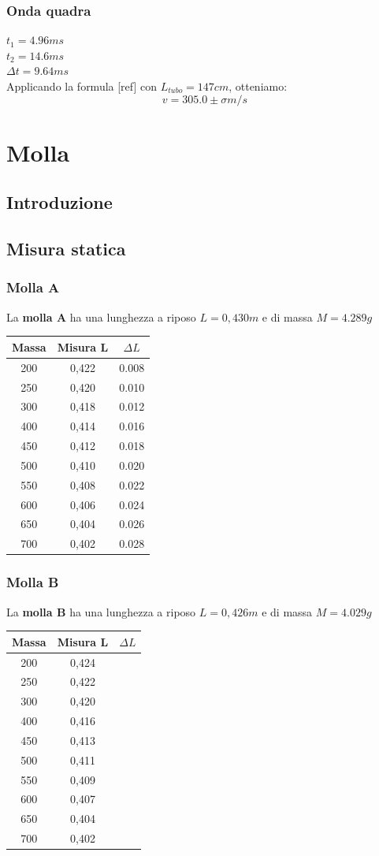 \documentclass[a4paper,10pt]{report}
\begin{document}
\subsection{Onda quadra}
$t_1 = 4.96 ms $\\
$t_2 = 14.6 ms $\\
$\Delta t = 9.64 ms $ \\
Applicando la formula [ref] con $L_{tubo} = 147 cm$, otteniamo:
$$ v = 305.0 \pm \sigma m/s $$ 



\chapter{Molla}
\section{Introduzione}
\section{Misura statica}
\subsection*{Molla A}
La \textbf{molla A} ha una lunghezza a riposo $L=0,430 m$ e di massa $M=4.289g$\\
\begin{tabular}{c|c|c}
Massa & Misura L & $\Delta L$ \\
\midrule
200 & 0,422 & 0.008\\
250 & 0,420 & 0.010\\
300 & 0,418 & 0.012\\
400 & 0,414 & 0.016\\
450 & 0,412 & 0.018\\
500 & 0,410 & 0.020\\
550 & 0,408 & 0.022\\
600 & 0,406 & 0.024\\
650 & 0,404 & 0.026\\
700 & 0,402 & 0.028\\
\end{tabular}
\subsection*{Molla B}
La \textbf{molla B} ha una lunghezza a riposo $L=0,426 m$ e di massa $M=4.029 g$\\
\begin{tabular}{c|c|c}
Massa & Misura L & $\Delta L$ \\
\midrule
200 & 0,424 &\\
250 & 0,422 & \\
300 & 0,420 & \\
400 & 0,416 & \\
450 &  0,413 & \\
500 & 0,411 & \\
550 & 0,409 &\\
600 & 0,407 &\\
650 & 0,404 &\\
700 & 0,402 &\\
\end{tabular}
\end{document}
